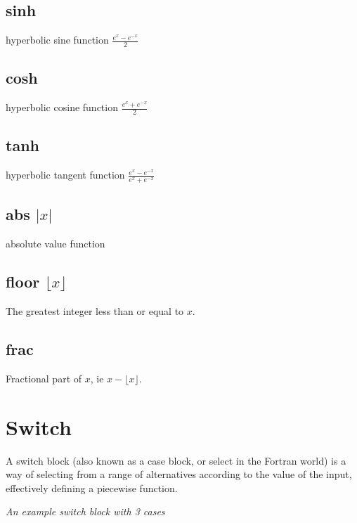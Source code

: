 \subsection{sinh}\label{Operation:sinh} hyperbolic sine function $\frac{e^x-e^{-x}}2$
\subsection{cosh}\label{Operation:cosh} hyperbolic cosine function $\frac{e^x+e^{-x}}2$
\subsection{tanh}\label{Operation:tanh} hyperbolic tangent function $\frac{e^x-e^{-x}}{e^x+e^{-x}}$
\subsection{abs $|x|$}\label{Operation:abs} absolute value function
\subsection{floor $\lfloor x\rfloor$}\label{Operation:floor} The greatest integer
  less than or equal to $x$.
\subsection{frac}\label{Operation:frac} Fractional part of $x$, ie $x-\lfloor x\rfloor$. 


\section{Switch}\label{SwitchIcon}

A switch block (also known as a case block, or select in the Fortran
world) is a way of selecting from a range of alternatives according
to the value of the input, effectively defining a piecewise function.

\begin{center}
{\em An example switch block with 3 cases}
\end{center}

